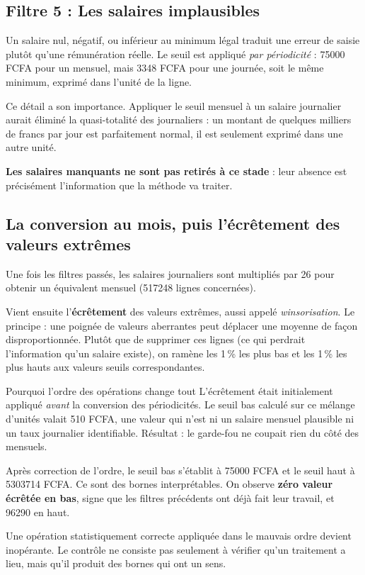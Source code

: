 \documentclass[11pt,a4paper]{article}
\begin{document}
\subsection{Filtre 5 : Les salaires implausibles}

Un salaire nul, négatif, ou inférieur au minimum légal traduit une erreur
de saisie plutôt qu'une rémunération réelle. Le seuil est appliqué
\emph{par périodicité} : \num{75000} FCFA pour un mensuel, mais
\num{3348} FCFA pour une journée, soit le même minimum, exprimé dans
l'unité de la ligne.

Ce détail a son importance. Appliquer le seuil mensuel à un salaire
journalier aurait éliminé la quasi-totalité des journaliers : un montant
de quelques milliers de francs par jour est parfaitement normal, il est
seulement exprimé dans une autre unité.

\textbf{Les salaires manquants ne sont pas retirés à ce
stade} : leur absence est précisément l'information que la méthode va
traiter.

\subsection{La conversion au mois, puis l'écrêtement des valeurs extrêmes}

Une fois les filtres passés, les salaires journaliers sont multipliés par
26 pour obtenir un équivalent mensuel (\num{517248} lignes concernées).

Vient ensuite l'\textbf{écrêtement} des valeurs extrêmes, aussi appelé
\emph{winsorisation}. Le principe : une poignée de valeurs aberrantes peut
déplacer une moyenne de façon disproportionnée. Plutôt que de supprimer
ces lignes (ce qui perdrait l'information qu'un salaire existe), on
ramène les 1\,\% les plus bas et les 1\,\% les plus hauts aux valeurs
seuils correspondantes.

\begin{encadre}{Pourquoi l'ordre des opérations change tout}
L'écrêtement était initialement appliqué \emph{avant} la conversion des
périodicités. Le seuil bas calculé sur ce mélange d'unités valait
\num{510} FCFA, une valeur qui n'est ni un salaire mensuel plausible ni
un taux journalier identifiable. Résultat : le garde-fou ne coupait rien
du côté des mensuels.

Après correction de l'ordre, le seuil bas s'établit à \num{75000} FCFA et
le seuil haut à \num{5303714} FCFA. Ce sont des bornes interprétables. On
observe \textbf{zéro valeur écrêtée en bas}, signe que les filtres
précédents ont déjà fait leur travail, et \num{96290} en haut.

Une opération statistiquement correcte appliquée dans le mauvais ordre
devient inopérante. Le contrôle ne consiste pas seulement à vérifier
qu'un traitement a lieu, mais qu'il produit des bornes qui ont un sens.
\end{encadre}
\end{document}
